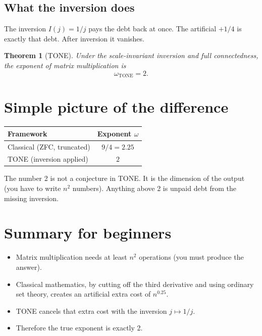 \documentclass[11pt,a4paper]{article}
\newtheorem{theorem}{Theorem}
\begin{document}
\subsection{What the inversion does}

The inversion \(I(j) = 1/j\) pays the debt back at once.  
The artificial \(+1/4\) is exactly that debt. After inversion it vanishes.

\begin{theorem}[TONE]
Under the scale-invariant inversion and full connectedness, the exponent of matrix multiplication is
\[
\omega_{\mathrm{TONE}} = 2.
\]
\end{theorem}

\begin{center}
\end{center}

\section{Simple picture of the difference}

\begin{center}
\begin{tabular}{lc}
\toprule
Framework & Exponent \(\omega\) \\
\midrule
Classical (ZFC, truncated) & \(9/4 = 2.25\) \\
TONE (inversion applied)   & \(2\) \\
\bottomrule
\end{tabular}
\end{center}

The number 2 is not a conjecture in TONE. It is the dimension of the output (you have to write \(n^2\) numbers). Anything above 2 is unpaid debt from the missing inversion.

\section{Summary for beginners}

\begin{itemize}
  \item Matrix multiplication needs at least \(n^2\) operations (you must produce the answer).
  \item Classical mathematics, by cutting off the third derivative and using ordinary set theory, creates an artificial extra cost of \(n^{0.25}\).
  \item TONE cancels that extra cost with the inversion \(j \mapsto 1/j\).
  \item Therefore the true exponent is exactly 2.
\end{itemize}
\end{document}
